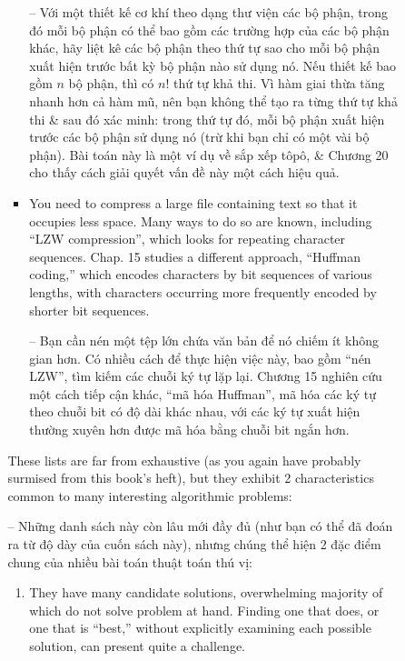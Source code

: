\documentclass{article}
\begin{document}
\begin{itemize}
\begin{itemize}
\begin{itemize}
\begin{itemize}
                -- Với một thiết kế cơ khí theo dạng thư viện các bộ phận, trong đó mỗi bộ phận có thể bao gồm các trường hợp của các bộ phận khác, hãy liệt kê các bộ phận theo thứ tự sao cho mỗi bộ phận xuất hiện trước bất kỳ bộ phận nào sử dụng nó. Nếu thiết kế bao gồm $n$ bộ phận, thì có $n!$ thứ tự khả thi. Vì hàm giai thừa tăng nhanh hơn cả hàm mũ, nên bạn không thể tạo ra từng thứ tự khả thi \& sau đó xác minh: trong thứ tự đó, mỗi bộ phận xuất hiện trước các bộ phận sử dụng nó (trừ khi bạn chỉ có một vài bộ phận). Bài toán này là một ví dụ về sắp xếp tôpô, \& Chương 20 cho thấy cách giải quyết vấn đề này một cách hiệu quả.
                \item You need to compress a large file containing text so that it occupies less space. Many ways to do so are known, including ``LZW compression'', which looks for repeating character sequences. Chap. 15 studies a different approach, ``Huffman coding,'' which encodes characters by bit sequences of various lengths, with characters occurring more frequently encoded by shorter bit sequences.
                
                -- Bạn cần nén một tệp lớn chứa văn bản để nó chiếm ít không gian hơn. Có nhiều cách để thực hiện việc này, bao gồm ``nén LZW'', tìm kiếm các chuỗi ký tự lặp lại. Chương 15 nghiên cứu một cách tiếp cận khác, ``mã hóa Huffman'', mã hóa các ký tự theo chuỗi bit có độ dài khác nhau, với các ký tự xuất hiện thường xuyên hơn được mã hóa bằng chuỗi bit ngắn hơn.
            \end{itemize}
            These lists are far from exhaustive (as you again have probably surmised from this book's heft), but they exhibit 2 characteristics common to many interesting algorithmic problems:
            
            -- Những danh sách này còn lâu mới đầy đủ (như bạn có thể đã đoán ra từ độ dày của cuốn sách này), nhưng chúng thể hiện 2 đặc điểm chung của nhiều bài toán thuật toán thú vị:
            \begin{enumerate}
                \item They have many candidate solutions, overwhelming majority of which do not solve problem at hand. Finding one that does, or one that is ``best,'' without explicitly examining each possible solution, can present quite a challenge.
                

\end{enumerate}
\end{itemize}
\end{itemize}
\end{itemize}
\end{document}
